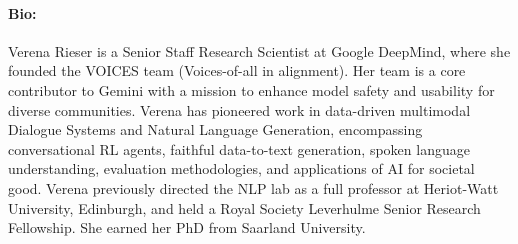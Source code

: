 \paragraph{Bio:}
Verena Rieser is a Senior Staff Research Scientist at Google DeepMind, where she founded the VOICES team (Voices-of-all in alignment). Her team is a core contributor to Gemini with a mission to enhance model safety and usability for diverse communities. Verena has pioneered work in data-driven multimodal Dialogue Systems and Natural Language Generation, encompassing conversational RL agents, faithful data-to-text generation, spoken language understanding, evaluation methodologies, and applications of AI for societal good. Verena previously directed the NLP lab as a full professor at Heriot-Watt University, Edinburgh, and held a Royal Society Leverhulme Senior Research Fellowship. She earned her PhD from Saarland University.


